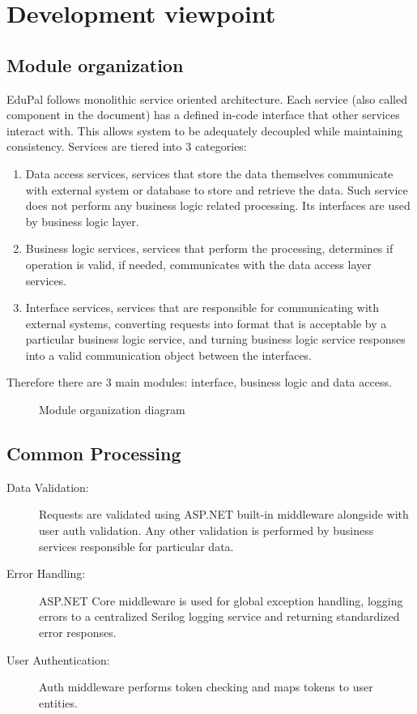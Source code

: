 \section{Development viewpoint}

\subsection{Module organization}

EduPal follows monolithic service oriented architecture. Each service (also called component in the document) has a defined in-code interface that other services interact with. This allows system to be adequately decoupled while maintaining consistency. Services are tiered into 3 categories:

\begin{enumerate}
  \item Data access services, services that store the data themselves communicate with external system or database to store and retrieve the data. Such service does not perform any business logic related processing. Its interfaces are used by business logic layer.
  \item Business logic services, services that perform the processing, determines if operation is valid, if needed, communicates with the data access layer services.
  \item Interface services, services that are responsible for communicating with external systems, converting requests into format that is acceptable by a particular business logic service, and turning business logic service responses into a valid communication object between the interfaces.
\end{enumerate}

Therefore there are 3 main modules: interface, business logic and data access.

\begin{figure}
  \caption{Module organization diagram}
  \label{fig:module-orgaz}
\end{figure}

\subsection{Common Processing}

\begin{description}
  \item[Data Validation:] Requests are validated using ASP.NET built-in middleware alongside with user auth validation. Any other validation is performed by business services responsible for particular data.

  \item[Error Handling:] ASP.NET Core middleware is used for global exception handling, logging errors to a centralized Serilog logging service  and returning standardized error responses.

  \item[User Authentication:] Auth middleware performs token checking and maps tokens to user entities.
\end{description}

